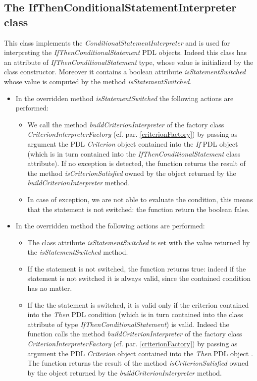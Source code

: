 \documentclass[a4paper,11pt] {ivoa}
\begin{document}
\subsection{The IfThenConditionalStatementInterpreter class}
This class implements the {\it ConditionalStatementInterpreter} and is used for interpreting the {\it IfThenConditionalStatement} PDL objects. Indeed this class has an attribute of {\it IfThenConditionalStatement} type, whose value is initialized by the class constructor. Moreover it contains a boolean attribute {\it isStatementSwitched} whose value is computed by the method {\it isStatementSwitched}.\\
\begin{itemize}
\item In the overridden method {\it isStatementSwitched} the following actions are performed:
\begin{itemize}
\item We call the method {\it buildCriterionInterpreter} of the factory class {\it CriterionInterpreterFactory} (cf. par. \ref{criterionFactory}) by passing as argument the PDL {\it Criterion} object contained into the {\it If} PDL object (which is in turn contained into the {\it IfThenConditionalStatement} class attribute). If no exception is detected, the function returns the result of the method {\it isCriterionSatisfied} owned by the object returned by the {\it buildCriterionInterpreter} method.
\item In case of exception, we are not able to evaluate the condition, this means that the statement is not switched: the function return the boolean false.\\
\end{itemize}
\item In the overridden method the following actions are performed:
\begin{itemize}
\item The class attribute {\it isStatementSwitched} is set with the value returned by the  {\it isStatementSwitched} method.
\item If the statement is not switched, the function returns true: indeed if the statement is not switched it is always valid, since the contained condition has no matter.
\item If the the statement is switched, it is valid only if the criterion contained into the {\it Then} PDL condition (which is in turn contained into the class attribute of type {\it IfThenConditionalStatement}) is valid. Indeed the function calls the method {\it buildCriterionInterpreter} of the factory class {\it CriterionInterpreterFactory} (cf. par. \ref{criterionFactory}) by passing as argument the PDL {\it Criterion} object contained into the {\it Then} PDL object . The function returns the result of the method {\it isCriterionSatisfied} owned by the object returned by the {\it buildCriterionInterpreter} method.
\end{itemize}
\end{itemize}
\end{document}
